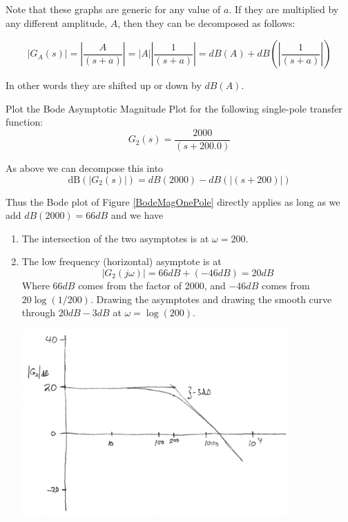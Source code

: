 Note that these graphs are generic for any value of $a$.   If they are multiplied by any different amplitude, $A$, then they can be decomposed as follows:

\[
|G_A(s) | = \left | \frac {A} {(s+a)} \right | =  |A|  \left | \frac {1} {(s+a)} \right | = dB(A) + dB \left ( \left | \frac {1} {(s+a)} \right | \right)
\]

In other words they are shifted up or down by $dB(A)$.




\begin{ExampleSmall}
Plot the Bode Asymptotic Magnitude Plot for the following single-pole transfer function:
\[
G_2(s) = \frac  {2000} {(s + 200.0)}
\]

As above we can decompose this into
\[
\mathrm{dB}(|G_2(s)|)  = dB(2000) - dB(|(s+200)|)
\]

Thus the Bode plot of Figure \ref{BodeMagOnePole} directly applies as long as we add $dB(2000) = 66dB$ and we have


\begin{enumerate}
  \item The intersection of the two asymptotes is at $\omega=200$.
  \item The low frequency (horizontal) asymptote is at
  \[
   |G_2(j\omega)| = 66dB + (-46dB) = 20dB
  \]
  Where $66dB$ comes from the factor of 2000, and $-46dB$ comes from $20\log(1/200)$.    Drawing the asymptotes and drawing the smooth curve through $20dB - 3dB$ at $\omega=\log(200)$.

  \includegraphics[width=4.0in]{figs05/00736a.png}
\end{enumerate}




\end{ExampleSmall}




